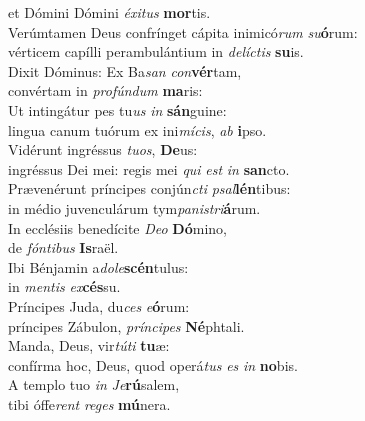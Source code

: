\evenverse et Dómini Dómini \textit{é}\textit{xi}\textit{tus} \textbf{mor}tis.\\
\oddverse Verúmtamen Deus confrínget cápita inimicó\textit{rum} \textit{su}\textbf{ó}rum:~\*\\
\oddverse vérticem capílli perambulántium in \textit{de}\textit{lí}\textit{ctis} \textbf{su}is.\\
\evenverse Dixit Dóminus: Ex Ba\textit{san} \textit{con}\textbf{vér}tam,~\*\\
\evenverse convértam in \textit{pro}\textit{fún}\textit{dum} \textbf{ma}ris:\\
\oddverse Ut intingátur pes tu\textit{us} \textit{in} \textbf{sán}guine:~\*\\
\oddverse lingua canum tuórum ex ini\textit{mí}\textit{cis}, \textit{ab} \textbf{i}pso.\\
\evenverse Vidérunt ingréssus \textit{tu}\textit{os}, \textbf{De}us:~\*\\
\evenverse ingréssus Dei mei: regis mei \textit{qui} \textit{est} \textit{in} \textbf{san}cto.\\
\oddverse Prævenérunt príncipes conjún\textit{cti} \textit{psal}\textbf{lén}tibus:~\*\\
\oddverse in médio juvenculárum tym\textit{pa}\textit{ni}\textit{stri}\textbf{á}rum.\\
\evenverse In ecclésiis benedícite \textit{De}\textit{o} \textbf{Dó}mino,~\*\\
\evenverse de \textit{fón}\textit{ti}\textit{bus} \textbf{Is}raël.\\
\oddverse Ibi Bénjamin a\textit{do}\textit{le}\textbf{scén}tulus:~\*\\
\oddverse in \textit{men}\textit{tis} \textit{ex}\textbf{cés}su.\\
\evenverse Príncipes Juda, du\textit{ces} \textit{e}\textbf{ó}rum:~\*\\
\evenverse príncipes Zábulon, \textit{prín}\textit{ci}\textit{pes} \textbf{Né}phtali.\\
\oddverse Manda, Deus, vir\textit{tú}\textit{ti} \textbf{tu}æ:~\*\\
\oddverse confírma hoc, Deus, quod operá\textit{tus} \textit{es} \textit{in} \textbf{no}bis.\\
\evenverse A templo tuo \textit{in} \textit{Je}\textbf{rú}salem,~\*\\
\evenverse tibi óffe\textit{rent} \textit{re}\textit{ges} \textbf{mú}nera.\\
